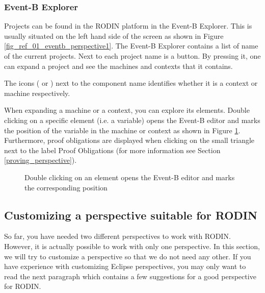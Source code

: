 \subsubsection{Event-B Explorer}
\label{eventb_explorer}

Projects can be found in the RODIN platform in the \textsf{Event-B Explorer}. This is usually situated on the left hand side of the screen as shown in Figure \ref{fig_ref_01_eventb_perspective1}. The \textsf{Event-B Explorer} contains a list of name of the current projects. Next to each project name is a  button. By pressing it, one can expand a project and see the machines and contexts that it contains.

The icons ( or ) next to the component name identifies whether it is a context or machine respectively.

When expanding a machine or a context, you can explore its elements. Double clicking on a specific element (i.e. a variable) opens the Event-B editor and marks the position of the variable in the machine or context as shown in Figure \ref{fig_ref_01_project_explorer1}. Furthermore, proof obligations are displayed when clicking on the small triangle next to the label \textsf{Proof Obligations} (for more information see Section \ref{proving_perspective}).

\begin{figure}[!ht]
\begin{center}
	\caption{Double clicking on an element opens the Event-B editor and marks the corresponding position}
	\label{fig_ref_01_project_explorer1}
\end{center}
\end{figure}

\subsection{Customizing a perspective suitable for RODIN}
\label{customizing_a_perspective_suitable_for_rodin}

So far, you have needed two different perspectives to work with RODIN. However, it is actually possible to work with only one perspective. In this section, we will try to customize a perspective so that we do not need any other. If you have experience with customizing Eclipse perspectives, you may only want to read the next paragraph which contains a few suggestions for a good perspective for RODIN.

